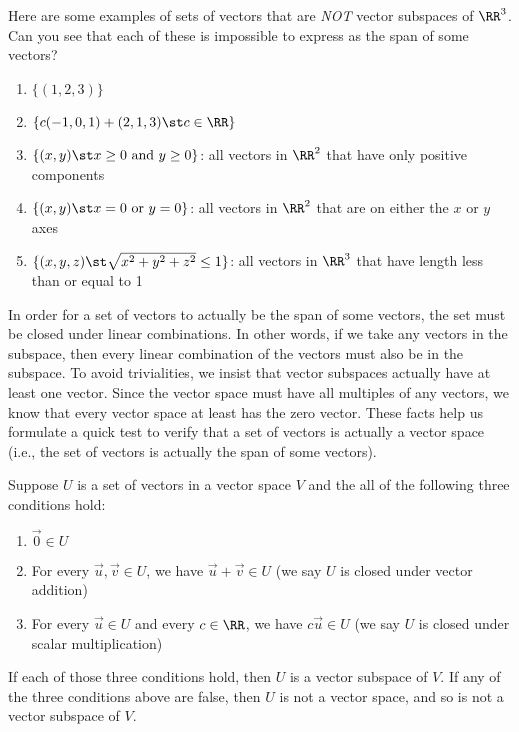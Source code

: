 
\begin{example}
  Here are some examples of sets of vectors that are \emph{NOT} vector subspaces of $\RR^3$.  Can you see that each of these is impossible to express as the span of some vectors?
  \begin{enumerate}
  \item $\{ (1,2,3)\}$
  \item $\{c(-1,0,1)+(2,1,3)\st c\in\RR\}$
  \item $\{(x,y) \st x\geq 0 \text{ and } y\geq0\}$: all vectors in $\RR^2$ that have only positive components
  \item $\{(x,y)\st x=0 \text{ or } y=0\}$: all vectors in $\RR^2$ that are on either the $x$ or $y$ axes
  \item $\{(x,y,z)\st \sqrt{x^2+y^2+z^2}\leq 1\}$: all vectors in $\RR^3$ that have length less than or equal to 1
  \end{enumerate}
\end{example}

In order for a set of vectors to actually be the span of some vectors, the set must be closed under linear combinations.  In other words, if we take any vectors in the subspace, then every linear combination of the vectors must also be in the subspace.  To avoid trivialities, we insist that vector subspaces actually have at least one vector.  Since the vector space must have all multiples of any vectors, we know that every vector space at least has the zero vector.  These facts help us formulate a quick test to verify that a set of vectors is actually a vector space (i.e., the set of vectors is actually the span of some vectors).

\begin{theorem}\label{thm subspace iff closed}
Suppose $U$ is a set of vectors in a vector space $V$ and the all of the following three conditions hold:
\begin{enumerate}
  \item $\vec 0\in U$
	\item For every $\vec u,\vec v\in U$, we have $\vec u+\vec v\in U$ (we say $U$ is closed under vector addition)
	\item For every $\vec u \in U$ and every $c\in \RR$, we have $c\vec u\in U$ (we say $U$ is closed under scalar multiplication)
\end{enumerate}
If each of those three conditions hold, then $U$ is a vector subspace of $V$.  If any of the three conditions above are false, then $U$ is not a vector space, and so is not a vector subspace of $V$.
\end{theorem}

